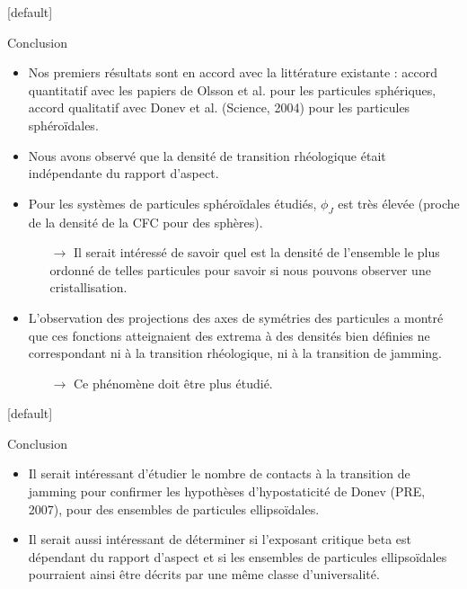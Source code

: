 \documentclass{beamer}
\begin{document}
{
\makeatletter %
    [default] %
    \def\beamer@entrycode{\vspace*{-\headheight}}
\begin{frame}{Conclusion}

\begin{itemize}
\item Nos premiers résultats sont en accord avec la littérature existante : accord quantitatif avec les papiers de Olsson et al. pour les particules sphériques, accord qualitatif avec Donev et al. (Science, 2004) pour les particules sphéroïdales.
\item Nous avons observé que la densité de transition rhéologique était indépendante du rapport d’aspect.
\item Pour les systèmes de particules sphéroïdales étudiés, $\phi_J$ est très élevée (proche de la densité de la CFC pour des sphères).
\begin{itemize}
\item[$\rightarrow$] Il serait intéressé de savoir quel est la densité de l’ensemble le plus ordonné de telles particules pour savoir si nous pouvons observer une cristallisation.
\end{itemize}
\item L’observation des projections des axes de symétries des particules a montré que ces fonctions atteignaient des extrema à des densités bien définies ne correspondant ni à la transition rhéologique, ni à la transition de jamming.
\begin{itemize}
\item[$\rightarrow$] Ce phénomène doit être plus étudié.
\end{itemize}
\end{itemize}

\end{frame}
}

{
\makeatletter %
    [default] %
    \def\beamer@entrycode{\vspace*{-\headheight}}
\begin{frame}{Conclusion}

\begin{itemize}
\item Il serait intéressant d’étudier le nombre de contacts à la transition de jamming pour confirmer les hypothèses d’hypostaticité de Donev (PRE, 2007), pour des ensembles de particules ellipsoïdales.
\item Il serait aussi intéressant de déterminer si l’exposant critique beta est dépendant du rapport d’aspect et si les ensembles de particules ellipsoïdales pourraient ainsi être décrits par une même classe d’universalité.
\end{itemize}

\end{frame}
}
\end{document}
